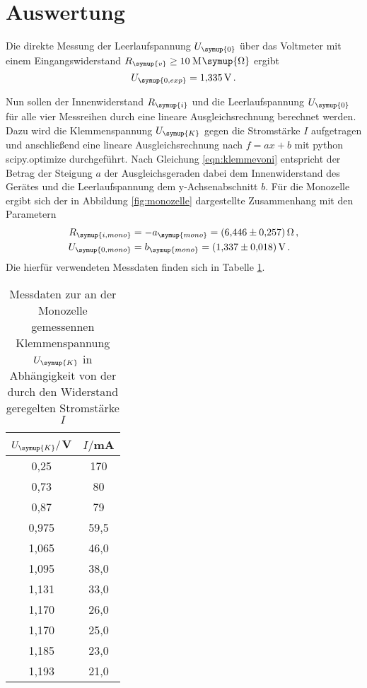 \section{Auswertung}
\label{sec:Auswertung}

Die direkte Messung der Leerlaufspannung $U_{\symup{0}}$ über das Voltmeter
mit einem Eingangswiderstand $R_{\symup{v}}\geq10$\,M$\symup{\Omega}$ ergibt
\begin{equation}
  U_{\symup{0,exp}} = \SI{1.335}{\volt}\,.
\end{equation}


Nun sollen der Innenwiderstand $R_{\symup{i}}$ und die Leerlaufspannung $U_{\symup{0}}$
für alle vier Messreihen durch eine lineare Ausgleichsrechnung berechnet werden.
Dazu wird die Klemmenspannung $U_{\symup{K}}$ gegen die Stromstärke $I$ aufgetragen
und anschließend eine lineare Ausgleichsrechnung nach $f=ax+b$ mit python scipy.optimize durchgeführt.
Nach Gleichung \eqref{eqn:klemmevoni} entspricht der Betrag der Steigung $a$ der Ausgleichsgeraden dabei dem Innenwiderstand des
Gerätes und die Leerlaufspannung dem y-Achsenabschnitt $b$. Für die Monozelle
ergibt sich der in Abbildung \ref{fig:monozelle} dargestellte Zusammenhang mit den
Parametern
\begin{align}
  R_{\symup{i,mono}}&=-a_{\symup{mono}} = \SI{6.446(0257)}{\ohm} \,, \\
  U_{\symup{0,mono}}&=b_{\symup{mono}} = \SI{1.337(0018)}{\volt} \,.
\end{align}
Die hierfür verwendeten Messdaten finden sich in Tabelle \ref{tab:monozelle}.

\begin{table}
  \centering
  \caption{Messdaten zur an der Monozelle gemessennen Klemmenspannung $U_{\symup{K}}$
  in Abhängigkeit von der durch den Widerstand geregelten Stromstärke $I$}
  \label{tab:monozelle}
  \begin{tabular}{c c}
    \toprule
    $U_{\symup{K}}/$V & $I/$mA\\
    \midrule
    0,25	&  170\\
    0,73	&  80\\
    0,87	&  79\\
    0,975	& 59,5\\
    1,065	& 46,0\\
    1,095	& 38,0\\
    1,131	& 33,0\\
    1,170	& 26,0\\
    1,170	& 25,0\\
    1,185	& 23,0\\
    1,193	& 21,0\\
    \bottomrule
  \end{tabular}
\end{table}

